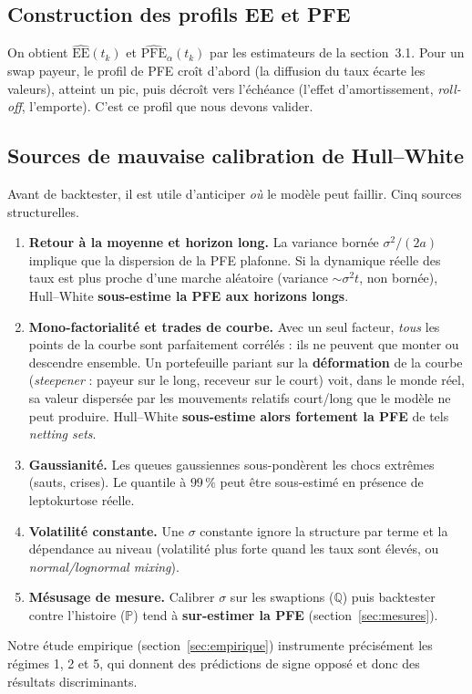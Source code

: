 \documentclass[11pt,a4paper]{article}
\newcommand{\PFE}{\mathrm{PFE}}
\newcommand{\EE}{\mathrm{EE}}
\newcommand{\Prob}{\mathbb{P}}
\newcommand{\Qmeas}{\mathbb{Q}}
\theoremstyle{remark}
\begin{document}
\subsection{Construction des profils EE et PFE}

On obtient $\widehat{\EE}(t_k)$ et $\widehat{\PFE}_\alpha(t_k)$ par les estimateurs de la section~3.1. Pour un swap payeur, le profil de PFE croît d'abord (la diffusion du taux écarte les valeurs), atteint un pic, puis décroît vers l'échéance (l'effet d'amortissement, \emph{roll-off}, l'emporte). C'est ce profil que nous devons valider.

\subsection{Sources de mauvaise calibration de Hull--White}
\label{sec:sources}

Avant de backtester, il est utile d'anticiper \emph{où} le modèle peut faillir. Cinq sources structurelles.
\begin{enumerate}[nosep]
  \item \textbf{Retour à la moyenne et horizon long.} La variance bornée $\sigma^2/(2a)$ implique que la dispersion de la PFE plafonne. Si la dynamique réelle des taux est plus proche d'une marche aléatoire (variance $\sim \sigma^2 t$, non bornée), Hull--White \textbf{sous-estime la PFE aux horizons longs}.
  \item \textbf{Mono-factorialité et trades de courbe.} Avec un seul facteur, \emph{tous} les points de la courbe sont parfaitement corrélés : ils ne peuvent que monter ou descendre ensemble. Un portefeuille pariant sur la \textbf{déformation} de la courbe (\emph{steepener} : payeur sur le long, receveur sur le court) voit, dans le monde réel, sa valeur dispersée par les mouvements relatifs court/long que le modèle ne peut produire. Hull--White \textbf{sous-estime alors fortement la PFE} de tels \emph{netting sets}.
  \item \textbf{Gaussianité.} Les queues gaussiennes sous-pondèrent les chocs extrêmes (sauts, crises). Le quantile à $99\,\%$ peut être sous-estimé en présence de leptokurtose réelle.
  \item \textbf{Volatilité constante.} Une $\sigma$ constante ignore la structure par terme et la dépendance au niveau (volatilité plus forte quand les taux sont élevés, ou \emph{normal/lognormal mixing}).
  \item \textbf{Mésusage de mesure.} Calibrer $\sigma$ sur les swaptions ($\Qmeas$) puis backtester contre l'histoire ($\Prob$) tend à \textbf{sur-estimer la PFE} (section~\ref{sec:mesures}).
\end{enumerate}
Notre étude empirique (section~\ref{sec:empirique}) instrumente précisément les régimes 1, 2 et 5, qui donnent des prédictions de signe opposé et donc des résultats discriminants.
\end{document}
